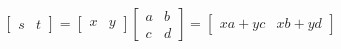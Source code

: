 \documentclass[10pt]{article}
\begin{document}
\[\left[ \begin{array}{ccc}
s & t
\end{array} \right]
=
\left[ \begin{array}{ccc}
x & y
\end{array} \right]
\left[ \begin{array}{ccc}
a & b\\
c & d\end{array} \right]
=
\left[ \begin{array}{ccc}
xa+yc & xb+yd
\end{array} \right]
\]
\end{document}
